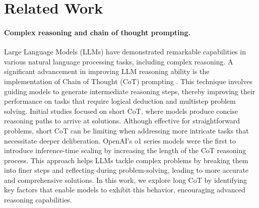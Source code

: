 \newpage
\appendix
\onecolumn


\section{Related Work}
\paragraph{Complex reasoning and chain of thought prompting.} Large Language Models (LLMs) have demonstrated remarkable capabilities in various natural language processing tasks, including complex reasoning. A significant advancement in improving LLM reasoning ability is the implementation of Chain of Thought (CoT) prompting \cite{wei2022cot}. This technique involves guiding models to generate intermediate reasoning steps, thereby improving their performance on tasks that require logical deduction and multistep problem solving. Initial studies \cite{lambert2024tulu, wei2022cot, flan, yu2024metamath} focused on short CoT, where models produce concise reasoning paths to arrive at solutions. Although effective for straightforward problems, short CoT can be limiting when addressing more intricate tasks that necessitate deeper deliberation. OpenAI’s o1 \cite{openai2024o1} series models were the first to introduce inference-time scaling by increasing the length of the CoT reasoning process. This approach helps LLMs tackle complex problems by breaking them into finer steps and reflecting during problem-solving, leading to more accurate and comprehensive solutions. In this work, we explore long CoT by identifying key factors that enable models to exhibit this behavior, encouraging advanced reasoning capabilities.


